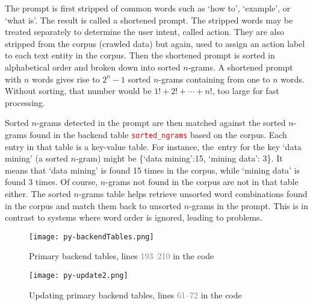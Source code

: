 \documentclass[10pt]{article}
\begin{document}
The prompt is first stripped of common words such as `how to', `example', or `what is'. The result is called a shortened prompt. The stripped words may be treated separately to determine the user intent, called \textcolor{index}{action}. They are also stripped from the corpus (crawled data) but again, used to assign an action label to each text entity in the corpus. Then the shortened prompt is sorted in alphabetical order and broken
 down into sorted \textcolor{index}{$n$-grams}. A shortened prompt with $n$ words gives rise to $2^n -1$ sorted $n$-grams containing from one to $n$ words. Without sorting, that number would be $1! + 2! + \cdots + n!$, too large for fast processing.

Sorted $n$-grams detected in the prompt are then matched against the sorted $n$-grams found in the backend table 
\textcolor{red}{\texttt{sorted\_ngrams}} based on the corpus. Each entry in that table is a key-value table.
For instance, the~entry for the key `data mining' (a sorted $n$-gram) might be \{`data mining':15, `mining data': 3\}.  
It means that `data mining' is found 15 times  in the corpus, while `mining data' is found 3 times. Of course, $n$-grams not found in the corpus are not in
 that table either. The sorted $n$-grams table helps retrieve unsorted word combinations found in the corpus and match them back to unsorted
 $n$-grams in the prompt. This is in contrast to systems where word order is ignored, leading to problems. 

\begin{figure}[H]
\centering
\texttt{[image: py-backendTables.png]}
\caption{Primary backend tables, lines \textcolor{gray}{193--210} in the code}
\label{fig:xcxzswsssytb}
\end{figure}

\begin{figure}[H]
\centering
\texttt{[image: py-update2.png]}
\caption{Updating primary backend tables, lines \textcolor{gray}{61--72} in the code}
\label{fig:hheg09ytb}
\end{figure}
\end{document}
